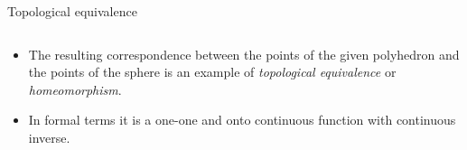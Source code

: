 \documentclass{beamer}
\begin{document}
\begin{frame}{Topological equivalence}
  \begin{columns}
    \begin{column}{1.0\textwidth}
      \begin{block}{}
        \begin{itemize}
        \item The resulting correspondence between the points of the given polyhedron and the points of the sphere is an example of \textsl{topological equivalence} or \textsl{homeomorphism}.
        \item In formal terms it is a one-one and onto continuous function with continuous inverse.
        \end{itemize}
      \end{block}
    \end{column}
  \end{columns}
\end{frame}
\end{document}
